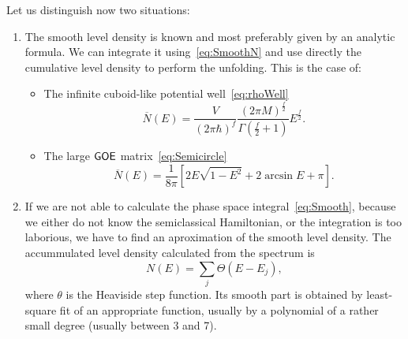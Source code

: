 \documentclass[a4paper,11pt,twoside]{article}
\begin{document}
        Let us distinguish now two situations:
        \begin{enumerate}
            \item The smooth level density is known and most preferably given by an analytic formula.
                We can integrate it using~\eqref{eq:SmoothN} and use directly the cumulative level density to perform the unfolding.
                This is the case of:
                \begin{itemize}
                    \item
                        The infinite cuboid-like potential well~\eqref{eq:rhoWell}
                        \begin{equation}
                            \label{eq:NWell}
                            \overline{N}(E)
                                =\frac{V}{\left(2\pi\hbar\right)^{f}}\frac{\left(2\pi M\right)^{\frac{f}{2}}}{\Gamma\left(\frac{f}{2}+1\right)}E^{\frac{f}{2}}.
                        \end{equation}
                    \item
                        The large $\mathsf{GOE}$ matrix~\eqref{eq:Semicircle}
                        \begin{equation}
                            \label{eq:NSemicircle}
                            \overline{N}(E)
                                =\frac{1}{8\pi}\left[2E\sqrt{1-E^2}+2\arcsin{E}+\pi\right].
                        \end{equation}
                \end{itemize}

            \item
                If we are not able to calculate the phase space integral~\eqref{eq:Smooth}, because we either do not know the semiclassical Hamiltonian, or the integration is too laborious, we have to find an aproximation of the smooth level density.
                The accummulated level density calculated from the spectrum is
                \begin{equation}
                    N(E)=\sum_{j}\Theta\left(E-E_{j}\right),
                \end{equation}
                where $\theta$ is the Heaviside step function.
                Its smooth part is obtained by least-square fit of an appropriate function, usually by a polynomial of a rather small degree (usually between 3 and 7).


\end{enumerate}
\end{document}
